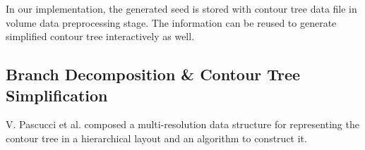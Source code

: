 \documentclass[11pt, b5paper]{report}
\begin{document}
In our implementation, the generated seed is stored with contour tree data
file in volume data preprocessing stage. The information can be reused to
generate simplified contour tree interactively as well.

\subsection{Branch Decomposition \& Contour Tree Simplification}
V. Pascucci et al.\cite{pascucci04:_multi} composed a multi-resolution data
structure for representing the contour tree in a hierarchical layout and an 
algorithm to construct it.

\begin{figure}[h!]
  \centering
\end{figure}
\end{document}
